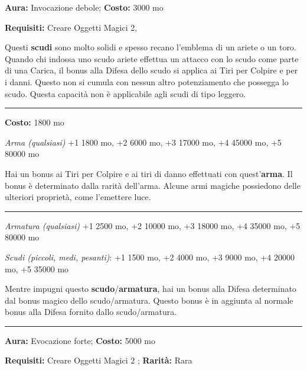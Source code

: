 \begin{multicols}{2}
\textbf{Aura:} Invocazione debole; \textbf{Costo:} 3000 mo

\textbf{Requisiti:} Creare Oggetti Magici 2,

Questi \textbf{scudi} sono molto solidi e spesso recano l'emblema di un ariete o un toro. Quando chi indossa uno scudo ariete effettua un attacco con lo scudo come parte di una Carica, il bonus alla Difesa dello scudo si applica ai Tiri per Colpire e per i danni. Questo non si cumula con nessun altro potenziamento che possegga lo scudo. Questa capacità non è applicabile agli scudi di tipo leggero.

\smallskip\noindent\rule{\linewidth}{2pt}  \hypertarget{Armamagica}{}\smallskip{}\noindent\label{Armamagica}

\textbf{Costo:} 1800 mo

\emph{Arma (qualsiasi)} +1 1800 mo, +2 6000 mo, +3 17000 mo, +4 45000 mo, +5 80000 mo

Hai un bonus ai Tiri per Colpire e ai tiri di danno effettuati con quest'\textbf{arma}. Il bonus è determinato dalla rarità dell'arma. Alcune armi magiche possiedono delle ulteriori proprietà, come l'emettere luce.

\smallskip\noindent\rule{\linewidth}{2pt}  \hypertarget{Armatura/ScudoMagico}{}\smallskip{}\noindent\label{Armatura/ScudoMagico}

\emph{Armatura (qualsiasi)} +1 2500 mo, +2 10000 mo, +3 18000 mo, +4 35000 mo, +5 80000 mo

\emph{Scudi (piccoli, medi, pesanti)}: +1 1500 mo, +2 4000 mo, +3 9000 mo, +4 20000 mo, +5 35000 mo

Mentre impugni questo \textbf{scudo}/\textbf{armatura}, hai un bonus alla Difesa determinato dal bonus magico dello scudo/armatura. Questo bonus è in aggiunta al normale bonus alla Difesa fornito dallo scudo/armatura.

\smallskip\noindent\rule{\linewidth}{2pt}  \hypertarget{ArmaturaDemoniaca}{}\smallskip{}\noindent\label{ArmaturaDemoniaca}

\textbf{Aura:} Evocazione forte; \textbf{Costo:} 5000 mo

\textbf{Requisiti:} Creare Oggetti Magici 2 ; \textbf{Rarità:} Rara


\end{multicols}
